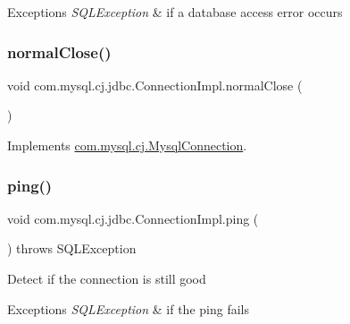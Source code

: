 \begin{DoxyExceptions}{Exceptions}
{\em S\+Q\+L\+Exception} & if a database access error occurs \\
\hline
\end{DoxyExceptions}
\mbox{\label{classcom_1_1mysql_1_1cj_1_1jdbc_1_1_connection_impl_a4bfd91b48bd990b05482d972c940a53f}} 
\subsubsection{\texorpdfstring{normal\+Close()}{normalClose()}}
{\footnotesize\ttfamily void com.\+mysql.\+cj.\+jdbc.\+Connection\+Impl.\+normal\+Close (\begin{DoxyParamCaption}{ }\end{DoxyParamCaption})}



Implements \mbox{\hyperlink{interfacecom_1_1mysql_1_1cj_1_1_mysql_connection_a15e693e5e3b333c7a29b238b510734ab}{com.\+mysql.\+cj.\+Mysql\+Connection}}.

\mbox{\label{classcom_1_1mysql_1_1cj_1_1jdbc_1_1_connection_impl_a790847769075cca4f1f42d47b864f3e3}} 
\subsubsection{\texorpdfstring{ping()}{ping()}}
{\footnotesize\ttfamily void com.\+mysql.\+cj.\+jdbc.\+Connection\+Impl.\+ping (\begin{DoxyParamCaption}{ }\end{DoxyParamCaption}) throws S\+Q\+L\+Exception}

Detect if the connection is still good


\begin{DoxyExceptions}{Exceptions}
{\em S\+Q\+L\+Exception} & if the ping fails \\
\hline
\end{DoxyExceptions}


